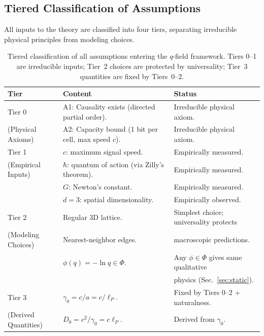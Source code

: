 \documentclass[aps,prd,twocolumn,showpacs,superscriptaddress,preprintnumbers]{revtex4-2}
\begin{document}
\subsection{Tiered Classification of Assumptions}
\label{sec:tiered}

All inputs to the theory are classified into four tiers, separating irreducible physical principles from modeling choices.

\begin{table}[h]
\centering
\caption{Tiered classification of all assumptions entering the $q$-field framework. Tiers 0--1 are irreducible inputs; Tier~2 choices are protected by universality; Tier~3 quantities are fixed by Tiers~0--2.}
\label{tab:tiers}
\begin{tabular}{p{}p{}p{}}
\toprule
\textbf{Tier} & \textbf{Content} & \textbf{Status} \\
\midrule
Tier 0 & A1: Causality exists (directed partial order). & Irreducible physical axiom. \\
(Physical Axioms) & A2: Capacity bound (1 bit per cell, max speed $c$). & Irreducible physical axiom. \\
\midrule
Tier 1 & $c$: maximum signal speed. & Empirically measured. \\
(Empirical Inputs) & $\hbar$: quantum of action (via Zilly's theorem). & Empirically measured. \\
& $G$: Newton's constant. & Empirically measured. \\
& $d=3$: spatial dimensionality. & Empirically observed. \\
\midrule
Tier 2 & Regular 3D lattice. & Simplest choice; universality protects \\
(Modeling Choices) & Nearest-neighbor edges. & macroscopic predictions. \\
& $\phi(q)=-\ln q \in \Phi$. & Any $\phi\in\Phi$ gives same qualitative \\
& & physics (Sec.~\ref{sec:static}). \\
\midrule
Tier 3 & $\gamma_0 = c/a = c/\ell_P$. & Fixed by Tiers 0--2 + naturalness. \\
(Derived Quantities) & $D_0 = c^2/\gamma_0 = c\ell_P$. & Derived from $\gamma_0$. \\
\bottomrule
\end{tabular}
\end{table}
\end{document}
